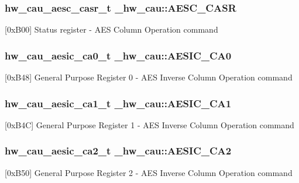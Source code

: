 \subsubsection[{\texorpdfstring{A\+E\+S\+C\+\_\+\+C\+A\+SR}{AESC_CASR}}]{ {\bf hw\+\_\+cau\+\_\+aesc\+\_\+casr\+\_\+t} \+\_\+hw\+\_\+cau\+::\+A\+E\+S\+C\+\_\+\+C\+A\+SR}\hypertarget{struct__hw__cau_ae339a4ac67679c118a76591bc7b2e932}{}\label{struct__hw__cau_ae339a4ac67679c118a76591bc7b2e932}
\mbox{[}0x\+B00\mbox{]} Status register -\/ A\+ES Column Operation command 
\subsubsection[{\texorpdfstring{A\+E\+S\+I\+C\+\_\+\+C\+A0}{AESIC_CA0}}]{ {\bf hw\+\_\+cau\+\_\+aesic\+\_\+ca0\+\_\+t} \+\_\+hw\+\_\+cau\+::\+A\+E\+S\+I\+C\+\_\+\+C\+A0}\hypertarget{struct__hw__cau_ae890fa860015b85bd371bb1180b3bbf3}{}\label{struct__hw__cau_ae890fa860015b85bd371bb1180b3bbf3}
\mbox{[}0x\+B48\mbox{]} General Purpose Register 0 -\/ A\+ES Inverse Column Operation command 
\subsubsection[{\texorpdfstring{A\+E\+S\+I\+C\+\_\+\+C\+A1}{AESIC_CA1}}]{ {\bf hw\+\_\+cau\+\_\+aesic\+\_\+ca1\+\_\+t} \+\_\+hw\+\_\+cau\+::\+A\+E\+S\+I\+C\+\_\+\+C\+A1}\hypertarget{struct__hw__cau_a03d58af755b1d40e7215e9d716745bdd}{}\label{struct__hw__cau_a03d58af755b1d40e7215e9d716745bdd}
\mbox{[}0x\+B4C\mbox{]} General Purpose Register 1 -\/ A\+ES Inverse Column Operation command 
\subsubsection[{\texorpdfstring{A\+E\+S\+I\+C\+\_\+\+C\+A2}{AESIC_CA2}}]{ {\bf hw\+\_\+cau\+\_\+aesic\+\_\+ca2\+\_\+t} \+\_\+hw\+\_\+cau\+::\+A\+E\+S\+I\+C\+\_\+\+C\+A2}\hypertarget{struct__hw__cau_a02e899af61dd70e50cd4aa7d47af2521}{}\label{struct__hw__cau_a02e899af61dd70e50cd4aa7d47af2521}
\mbox{[}0x\+B50\mbox{]} General Purpose Register 2 -\/ A\+ES Inverse Column Operation command 
